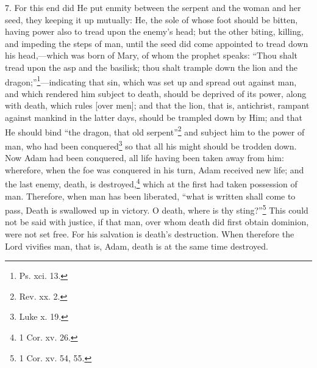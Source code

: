 7. For this end did He put enmity between the serpent and the woman and her seed, they keeping it up mutually: He, the sole of whose foot should be bitten, having power also to tread upon the enemy’s head; but the other biting, killing, and impeding the steps of man, until the seed did come appointed to tread down his head,—which was born of Mary, of whom the prophet speaks: “Thou shalt tread upon the asp and the basilisk; thou shalt trample down the lion and the dragon;”\footnote{Ps. xci. 13.}—indicating that sin, which was set up and spread out against man, and which rendered him subject to death, should be deprived of its power, along with death, which rules [over men]; and that the lion, that is, antichrist, rampant against mankind in the latter days, should be trampled down by Him; and that He should bind “the dragon, that old serpent”\footnote{Rev. xx. 2.} and subject him to the power of man, who had been conquered\footnote{Luke x. 19.} so that all his might should be trodden down. Now Adam had been conquered, all life having been taken away from him: wherefore, when the foe was conquered in his turn, Adam received new life; and the last enemy, death, is destroyed,\footnote{1 Cor. xv. 26.} which at the first had taken possession of man. Therefore, when man has been liberated, “what is written shall come to pass, Death is swallowed up in victory. O death, where is thy sting?”\footnote{1 Cor. xv. 54, 55.} This could not be said with justice, if that man, over whom death did first obtain dominion, were not set free. For his salvation is death’s destruction. When therefore the Lord vivifies man, that is, Adam, death is at the same time destroyed.

